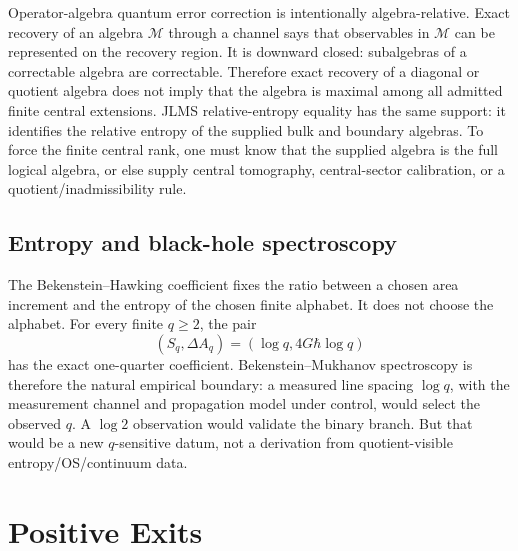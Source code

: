 \documentclass[12pt]{article}
\theoremstyle{definition}
\theoremstyle{remark}
\newcommand{\M}{\mathcal M}
\begin{document}
Operator-algebra quantum error correction is intentionally algebra-relative.
Exact recovery of an algebra \(\M\) through a channel says that observables in
\(\M\) can be represented on the recovery region.  It is downward closed:
subalgebras of a correctable algebra are correctable.  Therefore exact recovery
of a diagonal or quotient algebra does not imply that the algebra is maximal
among all admitted finite central extensions.  JLMS relative-entropy equality
has the same support: it identifies the relative entropy of the supplied bulk
and boundary algebras.  To force the finite central rank, one must know that
the supplied algebra is the full logical algebra, or else supply central
tomography, central-sector calibration, or a quotient/inadmissibility rule.

\subsection{Entropy and black-hole spectroscopy}

The Bekenstein--Hawking coefficient fixes the ratio between a chosen area
increment and the entropy of the chosen finite alphabet.  It does not choose the
alphabet.  For every finite \(q\ge2\), the pair
\[
  (S_q,\Delta A_q)=(\log q,4G\hbar\log q)
\]
has the exact one-quarter coefficient.  Bekenstein--Mukhanov spectroscopy is
therefore the natural empirical boundary: a measured line spacing
\(\log q\), with the measurement channel and propagation model under control,
would select the observed \(q\).  A \(\log2\) observation would validate the
binary branch.  But that would be a new \(q\)-sensitive datum, not a derivation
from quotient-visible entropy/OS/continuum data.

\section{Positive Exits}
\end{document}
